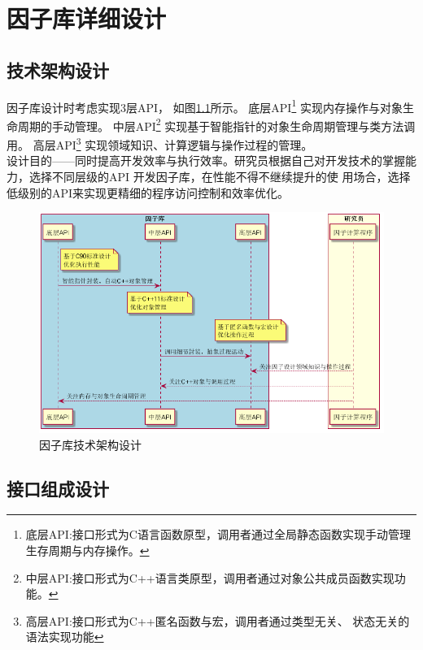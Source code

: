 \chapter{因子库详细设计}

\section{技术架构设计}

\large{因子库}\normalsize 设计时考虑实现3层API，
如图\ref{fig:s1-lmapi_structure}所示。
底层API\footnote{底层API:接口形式为C语言函数原型，调用者通过全局静态函数实现手动管理
生存周期与内存操作。}
实现内存操作与对象生命周期的手动管理。
中层API\footnote{中层API:接口形式为C++语言类原型，调用者通过对象公共成员函数实现功能。}
实现基于智能指针的对象生命周期管理与类方法调用。
高层API\footnote{高层API:接口形式为C++匿名函数与宏，调用者通过类型无关、
状态无关的语法实现功能}
实现领域知识、计算逻辑与操作过程的管理。\\

设计目的——同时提高开发效率与执行效率。研究员根据自己对开发技术的掌握能力，选择不同层级的API
开发因子库，在性能不得不继续提升的使
用场合，选择低级别的API来实现更精细的程序访问控制和效率优化。 \\

\begin{figure}[htbp]
\centering
\includegraphics[width=14cm]{sprint1-lmapi_structure.png}
\caption{因子库技术架构设计}
\label{fig:s1-lmapi_structure}
\end{figure}

\section{接口组成设计}

